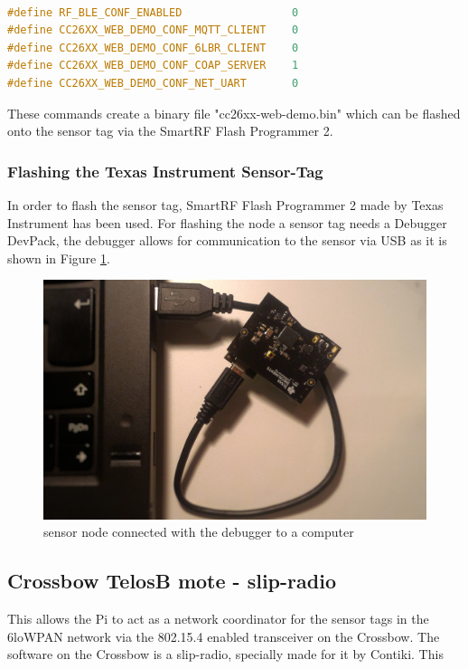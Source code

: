 \begin{lstlisting}[basicstyle=\small,language=c,caption={The configurisation file for the web-demo in directory: contiki/examples/cc26xx/cc26xx-web-demo/project-confg.h}]

#define RF_BLE_CONF_ENABLED                 0
#define CC26XX_WEB_DEMO_CONF_MQTT_CLIENT    0
#define CC26XX_WEB_DEMO_CONF_6LBR_CLIENT    0
#define CC26XX_WEB_DEMO_CONF_COAP_SERVER    1
#define CC26XX_WEB_DEMO_CONF_NET_UART       0
\end{lstlisting}

These commands create a binary file "cc26xx-web-demo.bin" which can be flashed onto the sensor tag via the SmartRF Flash Programmer 2.


\subsubsection{Flashing the Texas Instrument Sensor-Tag} 
\label{sec:flash}
In order to flash the sensor tag, SmartRF Flash Programmer 2 made by Texas Instrument has been used. For flashing the node a sensor tag needs a Debugger DevPack, the debugger allows for communication to the sensor via USB as it is shown in Figure \ref{fig:debug}.  
\begin{figure}[!h]
	\begin{center} 	
		\includegraphics[width=0.8\linewidth]{debugger}
		\caption{sensor node connected with the debugger to a computer}
		\label{fig:debug}
	\end{center}
\end{figure} 

\subsection{Crossbow TelosB mote - slip-radio}
This allows the Pi to act as a network coordinator for the sensor tags in the 6loWPAN network via the 802.15.4 enabled transceiver on the Crossbow. The software on the Crossbow is a slip-radio, specially made for it by Contiki. This